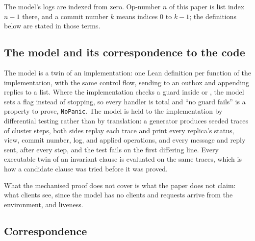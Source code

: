 \documentclass[11pt,a4paper]{article}
\theoremstyle{plain}
\theoremstyle{definition}
\theoremstyle{remark}
\begin{document}
The model's logs are indexed from zero. Op-number $n$ of this paper is
list index $n - 1$ there, and a commit number $k$ means indices $0$ to
$k - 1$; the definitions below are stated in those terms.

\subsection{The model and its correspondence to the code}

The model is a twin of an implementation: one Lean definition per
function of the implementation, with the same control flow, sending to
an outbox and appending replies to a list. Where the implementation
checks a guard inside  or , the
model sets a flag instead of stopping, so every handler is total and
``no guard fails'' is a property to prove, \texttt{NoPanic}. The model
is held to the implementation by differential testing rather than by
translation: a generator produces seeded traces of cluster steps, both
sides replay each trace and print every replica's status, view, commit
number, log, and applied operations, and every message and reply sent,
after every step, and the test fails on the first differing line. Every
executable twin of an invariant clause is evaluated on the same traces,
which is how a candidate clause was tried before it was proved.

What the mechanised proof does not cover is what the paper does not
claim: what clients see, since the model has no clients and requests
arrive from the environment, and liveness.

\subsection{Correspondence}
\end{document}
